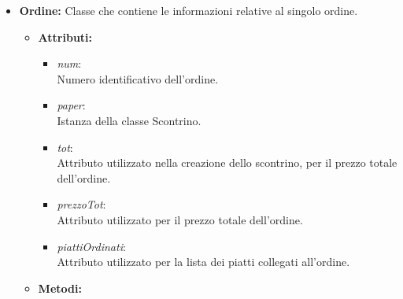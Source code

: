 \documentclass{article}
\begin{document}
\begin{itemize}
        \newpage
        
        \item \textbf{Ordine:} Classe che contiene le informazioni relative al singolo ordine.
        
        \begin{itemize}
            \item \textbf{Attributi:}
            
                \begin{itemize}
                    \item \textit{num}: \\Numero identificativo dell'ordine.\\
                    \item \textit{paper}: \\Istanza della classe Scontrino.\\
                    \item \textit{tot}: \\ Attributo utilizzato nella creazione dello scontrino, per il prezzo totale dell'ordine.\\
                    \item \textit{prezzoTot}: \\ Attributo utilizzato per il prezzo totale dell'ordine.\\
                    \item \textit{piattiOrdinati}: \\ Attributo utilizzato per la lista dei piatti collegati all'ordine.\\
                \end{itemize}
                
            \item \textbf{Metodi:}
            

\end{itemize}
\end{itemize}
\end{document}
